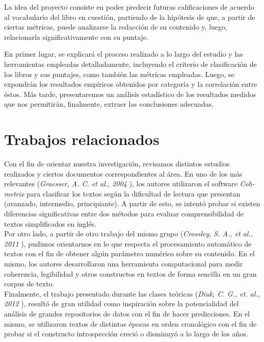 \documentclass[12pt,journal,compsoc]{IEEEtran}
\begin{document}
La idea del proyecto consiste en poder predecir futuras calificaciones de acuerdo al vocabulario del libro en cuestión, partiendo de la hipótesis de que, a partir de ciertas métricas, puede analizarse la redacción de su contenido y, luego, relacionarla significativamente con su puntaje.

En primer lugar, se explicará el proceso realizado a lo largo del estudio y las herramientas empleadas detalladamente, incluyendo el criterio de clasificación de los libros y sus puntajes, como también las métricas empleadas. Luego, se expondrán los resultados empíricos obtenidos por categoría y la correlación entre éstos. Más tarde, presentaremos un análisis estadístico de los resultados medidos que nos permitirán, finalmente, extraer las conclusiones adecuadas.

\section{Trabajos relacionados}
Con el fin de orientar nuestra investigación, revisamos distintos estudios realizados y ciertos documentos correspondientes al área. En uno de los más relevantes (\textit{Graesser, A. C. et al., 2004} \cite{graesser}), los autores utilizaron el software \textit{Coh-metrix} para clasificar los textos según la dificultad de lectura que presentan (avanzado, intermedio, principiante). A partir de esto, se intentó probar si existen diferencias significativas entre dos métodos para evaluar comprensibilidad de textos simplificados en inglés.\\
Por otro lado, a partir de otro trabajo del mismo grupo (\textit{Crossley, S. A., et al., 2011} \cite{crossley}), pudimos orientarnos en lo que respecta el procesamiento automático de textos con el fin de obtener algún parámetro numérico sobre su contenido. En el mismo, los autores desarrollaron una herramienta computacional para medir coherencia, legibilidad y otros constructos en textos de forma sencilla en un gran corpus de texto.\\
Finalmente, el trabajo presentado durante las clases teóricas (\textit{Diuk, C. G., et. al., 2012} \cite{diuk}), resultó de gran utilidad como inspiración sobre la potencialidad del análisis de grandes repositorios de datos con el fin de hacer predicciones. En el mismo, se utilizaron  textos de distintas épocas en orden cronológico con el fin de probar si el constructo introspección creció o disminuyó a lo largo de los años.
\end{document}
